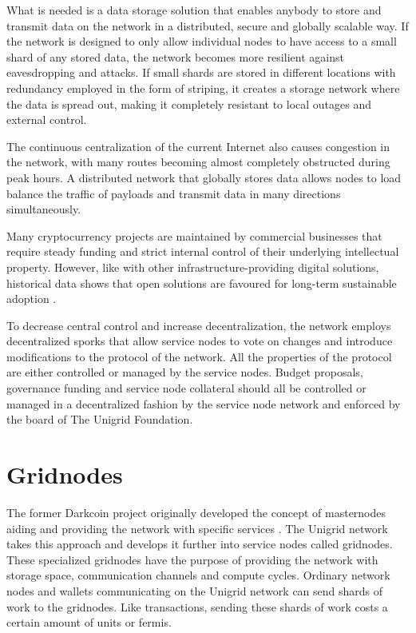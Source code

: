 \documentclass[10pt,a4paper,final]{article}
\begin{document}
What is needed is a data storage solution that enables anybody to store and transmit data on the network in a distributed, secure and globally scalable way. If the network is designed to only allow individual nodes to have access to a small shard of any stored data, the network becomes more resilient against eavesdropping and attacks. If small shards are stored in different locations with redundancy employed in the form of striping, it creates a storage network where the data is spread out, making it completely resistant to local outages and external control.

The continuous centralization of the current Internet also causes congestion in the network, with many routes becoming almost completely obstructed during peak hours. A distributed network that globally stores data allows nodes to load balance the traffic of payloads and transmit data in many directions simultaneously.

Many cryptocurrency projects are maintained by commercial businesses that require steady funding and strict internal control of their underlying intellectual property. However, like with other infrastructure-providing digital solutions, historical data shows that open solutions are favoured for long-term sustainable adoption \cite{historyinternet2019,historybitcoin2019}.

To decrease central control and increase decentralization, the network employs decentralized sporks that allow service nodes to vote on changes and introduce modifications to the protocol of the network. All the properties of the protocol are either controlled or managed by the service nodes. Budget proposals, governance funding and service node collateral should all be controlled or managed in a decentralized fashion by the service node network and enforced by the board of The Unigrid Foundation.

\section{Gridnodes}
The former Darkcoin project originally developed the concept of masternodes aiding and providing the network with specific services \cite{darkcoin2014}. The Unigrid network takes this approach and develops it further into service nodes called \glspl{gridnode}. These specialized \glspl{gridnode} have the purpose of providing the network with storage space, communication channels and compute cycles. Ordinary network nodes and wallets communicating on the Unigrid network can send shards of work to the \glspl{gridnode}. Like transactions, sending these shards of work costs a certain amount of \glspl{unit} or \glspl{fermi}.
\end{document}
